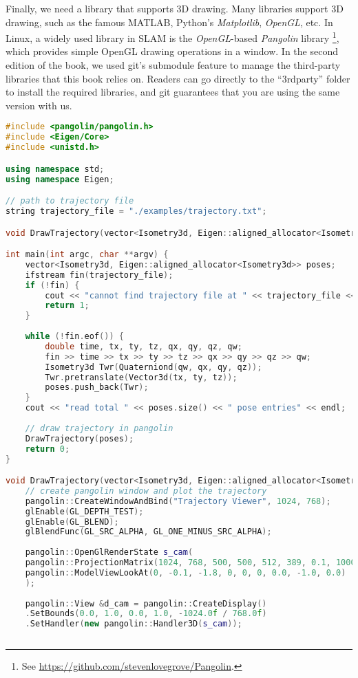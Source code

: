 Finally, we need a library that supports 3D drawing. Many libraries support 3D drawing, such as the famous MATLAB, Python's \textit{Matplotlib}, \textit{OpenGL}, etc. In Linux, a widely used library in SLAM is the \textit{OpenGL}-based \textit{Pangolin} library \footnote{See \url {https://github.com/stevenlovegrove/Pangolin}.}, which provides simple OpenGL drawing operations in a window. In the second edition of the book, we used git's submodule feature to manage the third-party libraries that this book relies on. Readers can go directly to the ``3rdparty'' folder to install the required libraries, and git guarantees that you are using the same version with us.

\begin{lstlisting}[language=c++,caption=slambook2/ch3/examples/plotTrajectory.cpp]
#include <pangolin/pangolin.h>
#include <Eigen/Core>
#include <unistd.h>

using namespace std;
using namespace Eigen;

// path to trajectory file
string trajectory_file = "./examples/trajectory.txt";

void DrawTrajectory(vector<Isometry3d, Eigen::aligned_allocator<Isometry3d>>);

int main(int argc, char **argv) {
	vector<Isometry3d, Eigen::aligned_allocator<Isometry3d>> poses;
	ifstream fin(trajectory_file);
	if (!fin) {
		cout << "cannot find trajectory file at " << trajectory_file << endl;
		return 1;
	}
	
	while (!fin.eof()) {
		double time, tx, ty, tz, qx, qy, qz, qw;
		fin >> time >> tx >> ty >> tz >> qx >> qy >> qz >> qw;
		Isometry3d Twr(Quaterniond(qw, qx, qy, qz));
		Twr.pretranslate(Vector3d(tx, ty, tz));
		poses.push_back(Twr);
	}
	cout << "read total " << poses.size() << " pose entries" << endl;
	
	// draw trajectory in pangolin
	DrawTrajectory(poses);
	return 0;
}

void DrawTrajectory(vector<Isometry3d, Eigen::aligned_allocator<Isometry3d>> poses) {
	// create pangolin window and plot the trajectory
	pangolin::CreateWindowAndBind("Trajectory Viewer", 1024, 768);
	glEnable(GL_DEPTH_TEST);
	glEnable(GL_BLEND);
	glBlendFunc(GL_SRC_ALPHA, GL_ONE_MINUS_SRC_ALPHA);
	
	pangolin::OpenGlRenderState s_cam(
	pangolin::ProjectionMatrix(1024, 768, 500, 500, 512, 389, 0.1, 1000),
	pangolin::ModelViewLookAt(0, -0.1, -1.8, 0, 0, 0, 0.0, -1.0, 0.0)
	);
	
	pangolin::View &d_cam = pangolin::CreateDisplay()
	.SetBounds(0.0, 1.0, 0.0, 1.0, -1024.0f / 768.0f)
	.SetHandler(new pangolin::Handler3D(s_cam));
	

\end{lstlisting}
